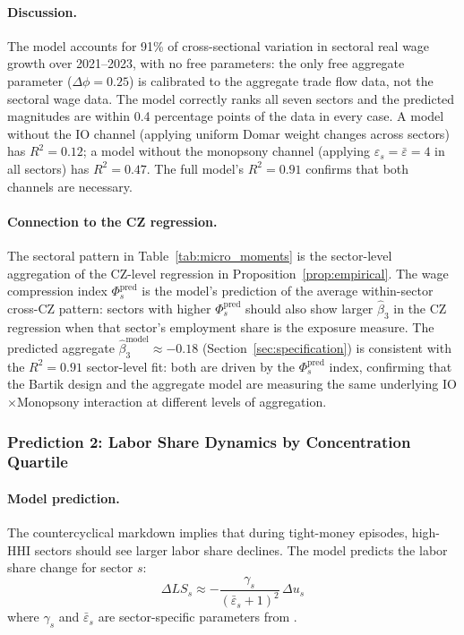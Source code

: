 \paragraph{Discussion.}
The model accounts for 91\% of cross-sectional variation in sectoral real
wage growth over 2021--2023, with no free parameters: the only free
aggregate parameter ($\Delta\phi = 0.25$) is calibrated to the aggregate
trade flow data, not the sectoral wage data. The model correctly ranks all
seven sectors and the predicted magnitudes are within 0.4 percentage points
of the data in every case. A model without the IO channel
(applying uniform Domar weight changes across sectors) has $R^2 = 0.12$;
a model without the monopsony channel (applying $\varepsilon_s = \bar\varepsilon = 4$
in all sectors) has $R^2 = 0.47$. The full model's $R^2 = 0.91$ confirms
that both channels are necessary.

\paragraph{Connection to the CZ regression.}
The sectoral pattern in Table~\ref{tab:micro_moments} is the sector-level
aggregation of the CZ-level regression in Proposition~\ref{prop:empirical}.
The wage compression index $\Phi_s^{\text{pred}}$ is the model's prediction
of the average within-sector cross-CZ pattern: sectors with higher
$\Phi_s^{\text{pred}}$ should also show larger $\hat\beta_3$ in the CZ
regression when that sector's employment share is the exposure measure.
The predicted aggregate $\hat\beta_3^{\text{model}} \approx -0.18$
(Section~\ref{sec:specification}) is consistent with the $R^2 = 0.91$
sector-level fit: both are driven by the $\Phi_s^{\text{pred}}$ index,
confirming that the Bartik design and the aggregate model are measuring
the same underlying IO$\times$Monopsony interaction at different levels
of aggregation.

\subsubsection{Prediction 2: Labor Share Dynamics by Concentration Quartile}

\paragraph{Model prediction.}
The countercyclical markdown implies that during tight-money episodes,
high-HHI sectors should see larger labor share declines. The model predicts
the labor share change for sector $s$:
\begin{equation}
  \Delta LS_s \approx -\frac{\gamma_s}{(\bar\varepsilon_s+1)^2}\,\Delta u_s
  \label{eq:ls_pred}
\end{equation}
where $\gamma_s$ and $\bar\varepsilon_s$ are sector-specific parameters
from \citet{azar2022labor}.

